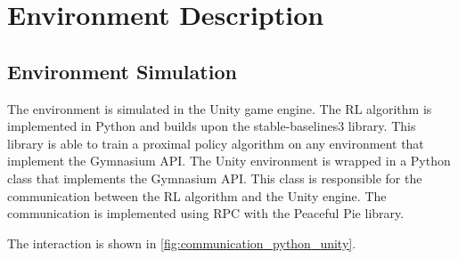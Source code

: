 \section{Environment Description}
\label{cha:env_description}

\subsection{Environment Simulation}
\label{sec:env_simulation}

The environment is simulated in the Unity game engine. The \ac{RL} algorithm is implemented in Python and builds upon the stable-baselines3 library. This library is able to train a proximal policy algorithm on any environment that implement the Gymnasium API. The Unity environment is wrapped in a Python class that implements the Gymnasium API. This class is responsible for the communication between the \ac{RL} algorithm and the Unity engine. The communication is implemented using \ac{RPC} with the Peaceful Pie \textcite{peacefulpie} library.

The interaction is shown in \ref{fig:communication_python_unity}.

\newcommand{\arenaImg}[1]{\texttt{[image: Bilder/image\_printer\_images/agent\_interaction/step\_\#1\_arena.png]}}
\newcommand{\agentImg}[1]{\texttt{[image: Bilder/image\_printer\_images/agent\_interaction/step\_\#1\_image\_from\_unity.png]}}

\newcommand\yOffsetc{-6.5}
\newcommand\xOffsetc{4.5}
\newcommand\envWidth{12}

\usetikzlibrary{decorations.pathreplacing}

